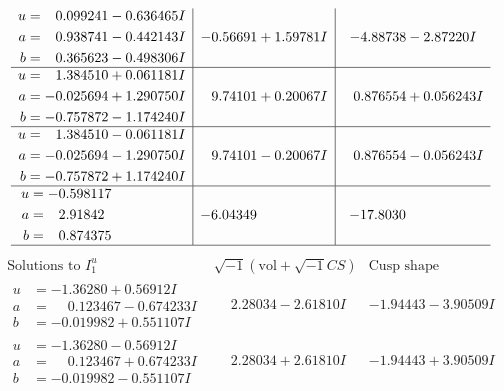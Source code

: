 \documentclass[1p]{elsarticle_modified}
\theoremstyle{definition}
\newcommand{\I}{\sqrt{-1}}
\begin{document}
$$\begin{array}{c|c|c}
\begin{aligned}
u &= \phantom{-}0.099241 - 0.636465 I \\
a &= \phantom{-}0.938741 - 0.442143 I \\
b &= \phantom{-}0.365623 - 0.498306 I\end{aligned}
 & -0.56691 + 1.59781 I & -4.88738 - 2.87220 I \\ \hline\begin{aligned}
u &= \phantom{-}1.384510 + 0.061181 I \\
a &= -0.025694 + 1.290750 I \\
b &= -0.757872 - 1.174240 I\end{aligned}
 & \phantom{-}9.74101 + 0.20067 I & \phantom{-}0.876554 + 0.056243 I \\ \hline\begin{aligned}
u &= \phantom{-}1.384510 - 0.061181 I \\
a &= -0.025694 - 1.290750 I \\
b &= -0.757872 + 1.174240 I\end{aligned}
 & \phantom{-}9.74101 - 0.20067 I & \phantom{-}0.876554 - 0.056243 I \\ \hline\begin{aligned}
u &= -0.598117\phantom{ +0.000000I} \\
a &= \phantom{-}2.91842\phantom{ +0.000000I} \\
b &= \phantom{-}0.874375\phantom{ +0.000000I}\end{aligned}
 & -6.04349\phantom{ +0.000000I} & -17.8030\phantom{ +0.000000I}\\
 \hline 
 \end{array}$$\newpage$$\begin{array}{c|c|c}  
\text{Solutions to }I^u_{1}& \I (\text{vol} + \sqrt{-1}CS) & \text{Cusp shape}\\
 \hline 
\begin{aligned}
u &= -1.36280 + 0.56912 I \\
a &= \phantom{-}0.123467 - 0.674233 I \\
b &= -0.019982 + 0.551107 I\end{aligned}
 & \phantom{-}2.28034 - 2.61810 I & -1.94443 - 3.90509 I \\ \hline\begin{aligned}
u &= -1.36280 - 0.56912 I \\
a &= \phantom{-}0.123467 + 0.674233 I \\
b &= -0.019982 - 0.551107 I\end{aligned}
 & \phantom{-}2.28034 + 2.61810 I & -1.94443 + 3.90509 I \\ \hline\begin{aligned}

\end{aligned}
\end{array}$$
\end{document}
